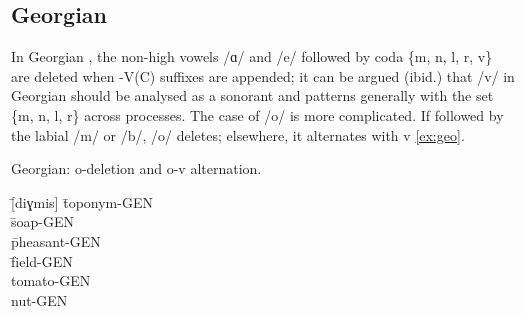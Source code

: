 \subsection{Georgian}\label{ss:georgian}

In Georgian \citep[p.~90]{Butskh2002}, the non-high vowels /ɑ/ and /e/ followed by coda \{m, n, l, r, v\} are deleted when -V(C) suffixes are appended\footnotemark; it can be argued (ibid.) that /v/ in Georgian should be analysed as a sonorant and patterns generally with the set \{m, n, l, r\} across processes. The case of /o/ is more complicated. If followed by the labial /m/ or /b/, /o/ deletes; elsewhere, it alternates with v \cref{ex:geo}.

\clearpage
\begin{example}\label{ex:geo} Georgian: o-deletion and o-v alternation. \citep[p.~82~\&~95]{Butskh2002}
\begin{tabbing}
  \tab[2cm] \=  [diɣmis] \tab[2cm] \=  toponym-{\sc\scriptsize GEN} \\
    \> \= soap-{\sc\scriptsize GEN} \\
   \> [xoxbis] \> \= pheasant-{\sc\scriptsize GEN} \\
   \> [mindvris] \> \= field-{\sc\scriptsize GEN}\\
   \tab[2cm] \> [p'amidvris] \tab[2cm] \> tomato-{\sc\scriptsize GEN}\\
   \tab[2cm] \> [nigvzis] \tab[2cm] \> nut-{\sc\scriptsize GEN}
\end{tabbing}
\end{example}


